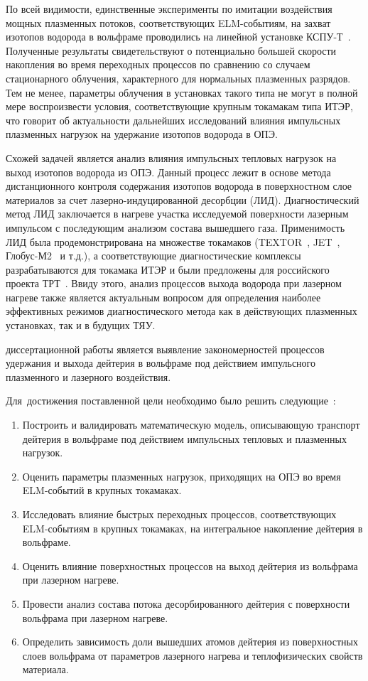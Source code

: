 По всей видимости, единственные эксперименты по имитации воздействия мощных плазменных потоков, соответствующих ELM-событиям, на захват изотопов водорода в вольфраме проводились на линейной установке КСПУ-Т~\cite{Ogorodnikova}. Полученные результаты свидетельствуют о потенциально большей скорости накопления во время переходных процессов по сравнению со случаем стационарного облучения, характерного для нормальных плазменных разрядов. Тем не менее, параметры облучения в установках такого типа не могут в полной мере воспроизвести условия, соответствующие крупным токамакам типа ИТЭР, что говорит об актуальности дальнейших исследований влияния импульсных плазменных нагрузок на удержание изотопов водорода в ОПЭ.

Схожей задачей является анализ влияния импульсных тепловых нагрузок на выход изотопов водорода из ОПЭ. Данный процесс лежит в основе метода дистанционного контроля содержания изотопов водорода в поверхностном слое материалов за счет лазерно-индуцированной десорбции (ЛИД). Диагностический метод ЛИД заключается в нагреве участка исследуемой поверхности лазерным импульсом с последующим анализом состава вышедшего газа. Применимость ЛИД была продемонстрирована на множестве токамаков (TEXTOR~\cite{Schweer2009}, JET~\cite{Zlobinski2024}, Глобус-М2~\cite{Medvedev2024} и т.д.), а соответствующие диагностические комплексы разрабатываются для токамака ИТЭР и были предложены для российского проекта ТРТ~\cite{Razdobarin2022}. Ввиду этого, анализ процессов выхода водорода при лазерном нагреве также является актуальным вопросом для определения наиболее эффективных режимов диагностического метода как в действующих плазменных установках, так и в будущих ТЯУ.

{\aim} диссертационной работы является выявление закономерностей процессов удержания и выхода дейтерия в вольфраме под действием импульсного плазменного и
лазерного воздействия.

Для~достижения поставленной цели необходимо было решить следующие~{\tasks}:
\begin{enumerate}[beginpenalty=10000] %
    \item Построить и валидировать математическую модель, описывающую транспорт дейтерия в вольфраме под действием импульсных тепловых и плазменных нагрузок.
    \item Оценить параметры плазменных нагрузок, приходящих на ОПЭ во время ELM-событий в крупных токамаках.
    \item Исследовать влияние быстрых переходных процессов, соответствующих ELM-событиям в крупных токамаках, на интегральное накопление дейтерия в вольфраме.
    \item Оценить влияние поверхностных процессов на выход дейтерия из вольфрама при лазерном нагреве.
    \item Провести анализ состава потока десорбированного дейтерия с поверхности вольфрама при лазерном нагреве.
    \item Определить зависимость доли вышедших атомов дейтерия из поверхностных слоев вольфрама от параметров лазерного нагрева и теплофизических свойств материала.
\end{enumerate}

